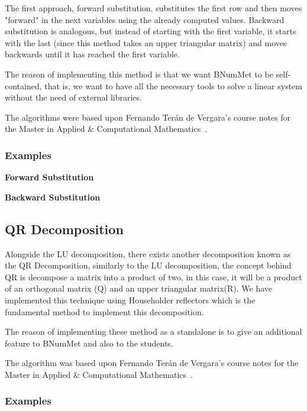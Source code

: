 The first approach, forward substitution, substitutes the first row and then moves "forward" in the next variables using the already computed values. Backward substitution is analogous, but instead of starting with the first variable, it starts with the last (since this method takes an upper triangular matrix) and moves backwards until it has reached the first variable.

The reason of implementing this method is that we want BNumMet to be self-contained, that is, we want to have all the necessary tools to solve a linear system without the need of external libraries.

The algorithms were based upon Fernando Terán de Vergara's course notes for the Master in Applied \& Computational Mathematics~\cite{Vergara}.
\subsubsection{Examples}
\textbf{Forward Substitution}
	
 \textbf{Backward Substitution}
	
\subsection{QR Decomposition}
Alongside the LU decomposition, there exists another decomposition known as the QR Decomposition, similarly to the LU decomposition, the concept behind QR is decompose a matrix into a product of two, in this case, it will be a product of an orthogonal matrix (Q) and an upper triangular matrix(R). We have implemented this technique using Householder reflectors which is the fundamental method to implement this decomposition.

The reason of implementing these method as a standalone is to give an additional feature to BNumMet and also to the students. %

The algorithm was based upon Fernando Terán de Vergara's course notes for the Master in Applied \& Computational Mathematics~\cite{Vergara}.
\subsubsection{Examples}


